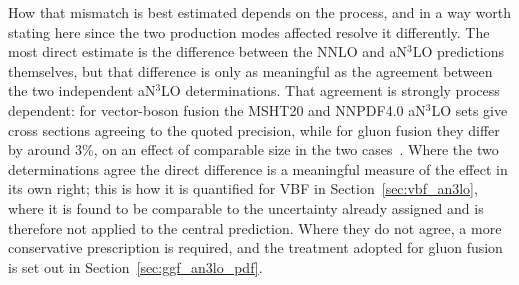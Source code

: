 How that mismatch is best estimated depends on the process, and in a way worth
stating here since the two production modes affected resolve it differently.
The most direct estimate is the difference between the NNLO and aN$^3$LO
predictions themselves, but that difference is only as meaningful as the
agreement between the two independent aN$^3$LO determinations. That agreement
is strongly process dependent: for vector-boson fusion the MSHT20 and NNPDF4.0
aN$^3$LO sets give cross sections agreeing to the quoted precision, while for
gluon fusion they differ by around $3\%$, on an effect of comparable size in
the two cases~\cite{Cridge:2024icl}. Where the two determinations agree the
direct difference is a meaningful measure of the effect in its own right; this
is how it is quantified for VBF in Section~\ref{sec:vbf_an3lo}, where it is
found to be comparable to the uncertainty already assigned and is therefore not
applied to the central prediction. Where they do not agree, a more conservative
prescription is required, and the treatment adopted for gluon fusion is set out
in Section~\ref{sec:ggf_an3lo_pdf}.
